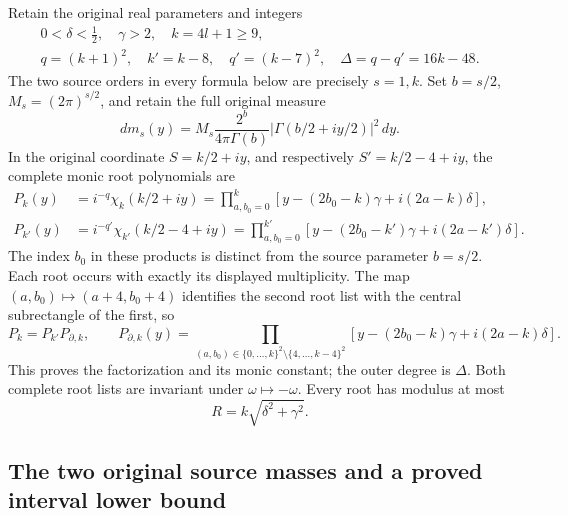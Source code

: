 \documentclass[11pt,a4paper]{article}
\begin{document}
Retain the original real parameters and integers
\[
\begin{gathered}
0<\delta<\tfrac12,\quad \gamma>2,\quad k=4l+1\ge9,\\
q=(k+1)^2,\quad k'=k-8,\quad q'=(k-7)^2,\quad
\Delta=q-q'=16k-48.
\end{gathered}\tag{OSP1}
\]
The two source orders in every formula below are precisely $s=1,k$.
Set $b=s/2$, $M_s=(2\pi)^{s/2}$, and retain the full original measure
\[
dm_s(y)=M_s\frac{2^b}{4\pi\Gamma(b)}
       |\Gamma(b/2+iy/2)|^2\,dy.
\tag{OSP2}
\]
In the original coordinate $S=k/2+iy$, and respectively
$S'=k/2-4+iy$, the complete monic root polynomials are
\[
\begin{split}
P_k(y)&=i^{-q}\chi_k(k/2+iy)
 =\prod_{a,b_0=0}^{k}
 [y-(2b_0-k)\gamma+i(2a-k)\delta],\\
P_{k'}(y)&=i^{-q'}\chi_{k'}(k/2-4+iy)
 =\prod_{a,b_0=0}^{k'}
 [y-(2b_0-k')\gamma+i(2a-k')\delta].
\end{split}\tag{OSP3}
\]
The index $b_0$ in these products is distinct from the source parameter
$b=s/2$. Each root occurs with exactly its displayed multiplicity.
The map $(a,b_0)\mapsto(a+4,b_0+4)$ identifies the second root list
with the central subrectangle of the first, so
\[
P_k=P_{k'}P_{\partial,k},\qquad
P_{\partial,k}(y)=
\prod_{(a,b_0)\in\{0,\ldots,k\}^2\setminus\{4,\ldots,k-4\}^2}
[y-(2b_0-k)\gamma+i(2a-k)\delta].
\tag{OSP4}
\]
This proves the factorization and its monic constant; the outer degree
is $\Delta$. Both complete root lists are invariant under
$\omega\mapsto-\omega$. Every root has modulus at most
\[
R=k\sqrt{\delta^2+\gamma^2}.
\tag{OSP5}
\]

\subsection{The two original source masses and a proved interval lower bound}
\end{document}
